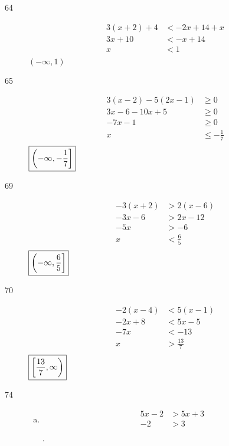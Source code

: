 \documentclass[letterpaper, landscape]{exam}
\begin{document}
\begin{description}
      \item[64]
        \begin{align*}
          3(x + 2) + 4 & < -2x + 14 + x \\
          3x + 10      & < -x + 14 \\
          x            & < 1 \\
        \end{align*}
        $\boxed{ (-\infty, 1) }$

      \item[65]
        \begin{align*}
          3(x - 2) - 5(2x - 1) & \geq 0 \\
          3x - 6 - 10x + 5     & \geq 0 \\
          -7x - 1              & \geq 0 \\
          x                    & \leq - \frac{1}{7} \\
        \end{align*}
        $\boxed{ \intoc{ -\infty, - \frac{1}{7} } }$

      \item[69]
        \begin{align*}
          -3(x + 2) & > 2(x - 6) \\
          -3x - 6   & > 2x - 12 \\
          -5x       & > -6 \\
          x         & < \frac{6}{5} \\
        \end{align*}
        $\boxed{ \intoc{ -\infty, \frac{6}{5} } }$

      \item[70]
        \begin{align*}
          -2(x - 4) & < 5(x - 1) \\
          -2x + 8   & < 5x - 5 \\
          -7x       & < -13 \\
          x         & > \frac{13}{7} \\
        \end{align*}
        $\boxed{ \intco{ \frac{13}{7}, \infty } }$

      \item[74]
        \begin{enumerate}[(a)]
          \item
            \begin{align*}
              5x - 2 & > 5x + 3 \\
              -2     & > 3 \\
            \end{align*}
            .


\end{enumerate}
\end{description}
\end{document}
